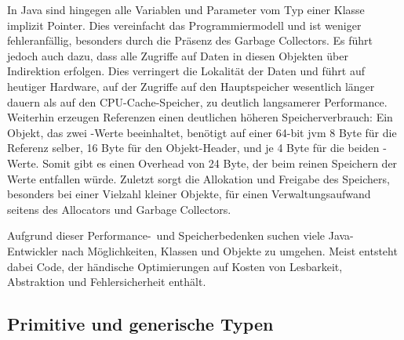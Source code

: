 In Java sind hingegen alle Variablen und Parameter vom Typ einer Klasse implizit Pointer.
Dies vereinfacht das Programmiermodell und ist weniger fehleranfällig, besonders durch die Präsenz des Garbage Collectors.
Es führt jedoch auch dazu, dass alle Zugriffe auf Daten in diesen Objekten über Indirektion erfolgen.
Dies verringert die Lokalität der Daten und führt auf heutiger Hardware, auf der Zugriffe auf den Hauptspeicher wesentlich länger dauern als auf den CPU-Cache-Speicher, zu deutlich langsamerer Performance. %
Weiterhin erzeugen Referenzen einen deutlichen höheren Speicherverbrauch:
Ein Objekt, das zwei -Werte beeinhaltet, benötigt auf einer 64-bit \ac{jvm} 8 Byte für die Referenz selber, 16 Byte für den Objekt-Header, und je 4 Byte für die beiden -Werte.
Somit gibt es einen Overhead von 24 Byte, der beim reinen Speichern der Werte entfallen würde.
Zuletzt sorgt die Allokation und Freigabe des Speichers, besonders bei einer Vielzahl kleiner Objekte, für einen Verwaltungsaufwand seitens des Allocators und Garbage Collectors.

Aufgrund dieser Performance-\ und Speicherbedenken suchen viele Java-Entwickler nach Möglichkeiten, Klassen und Objekte zu umgehen.
Meist entsteht dabei Code, der händische Optimierungen auf Kosten von Lesbarkeit, Abstraktion und Fehlersicherheit enthält.

\subsection{Primitive und generische Typen}\label{subsec:primitive-generics}
